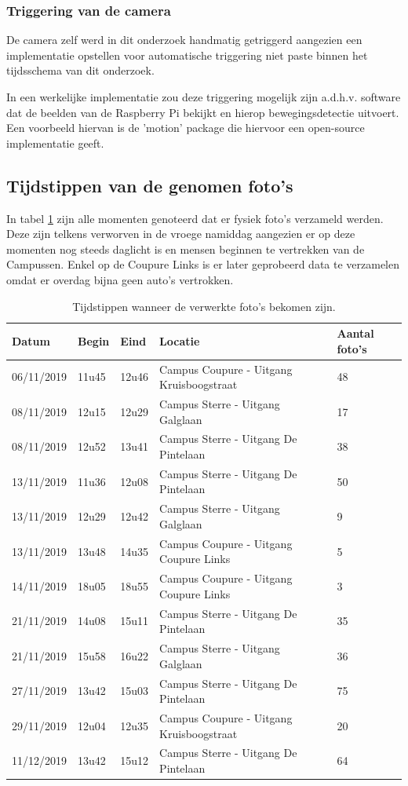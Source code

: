 \subsubsection{Triggering van de camera}
De camera zelf werd in dit onderzoek handmatig getriggerd aangezien een implementatie opstellen voor automatische triggering niet paste binnen het tijdsschema van dit onderzoek.

In een werkelijke implementatie zou deze triggering mogelijk zijn a.d.h.v. software dat de beelden van de Raspberry Pi bekijkt en hierop bewegingsdetectie uitvoert. Een voorbeeld hiervan is de 'motion' package die hiervoor een open-source implementatie geeft.

\subsection{Tijdstippen van de genomen foto's}
In tabel \ref{tab:fototijdstippen} zijn alle momenten genoteerd dat er fysiek foto's verzameld werden. Deze zijn telkens verworven in de vroege namiddag aangezien er op deze momenten nog steeds daglicht is en mensen beginnen te vertrekken van de Campussen. Enkel op de Coupure Links is er later geprobeerd data te verzamelen omdat er overdag bijna geen auto's vertrokken.
\begin{table}[h!]
\centering
\begin{tabular}{l|l|l|l|l}
	Datum 		& Begin & Eind	& Locatie	& Aantal foto's \\ \hline
	06/11/2019	& 11u45 & 12u46	& Campus Coupure - Uitgang Kruisboogstraat	& 48	\\
	08/11/2019	& 12u15 & 12u29	& Campus Sterre - Uitgang Galglaan	& 17	\\
	08/11/2019	& 12u52 & 13u41	& Campus Sterre - Uitgang De Pintelaan	& 38	\\
	13/11/2019	& 11u36 & 12u08	& Campus Sterre - Uitgang De Pintelaan	& 50	\\
	13/11/2019	& 12u29 & 12u42	& Campus Sterre - Uitgang Galglaan	& 9	\\
	13/11/2019	& 13u48 & 14u35	& Campus Coupure - Uitgang Coupure Links	& 5	\\
	14/11/2019	& 18u05 & 18u55	& Campus Coupure - Uitgang Coupure Links	& 3	\\
	21/11/2019	& 14u08 & 15u11	& Campus Sterre - Uitgang De Pintelaan	& 35	\\
	21/11/2019	& 15u58 & 16u22	& Campus Sterre - Uitgang Galglaan	& 36	\\
	27/11/2019	& 13u42 & 15u03	& Campus Sterre - Uitgang De Pintelaan	& 75	\\
	29/11/2019	& 12u04 & 12u35	& Campus Coupure - Uitgang Kruisboogstraat	& 20	\\
	11/12/2019	& 13u42 & 15u12	& Campus Sterre - Uitgang De Pintelaan	& 64	\\
\end{tabular}
\caption{Tijdstippen wanneer de verwerkte foto's bekomen zijn.}
\label{tab:fototijdstippen}
\end{table}

